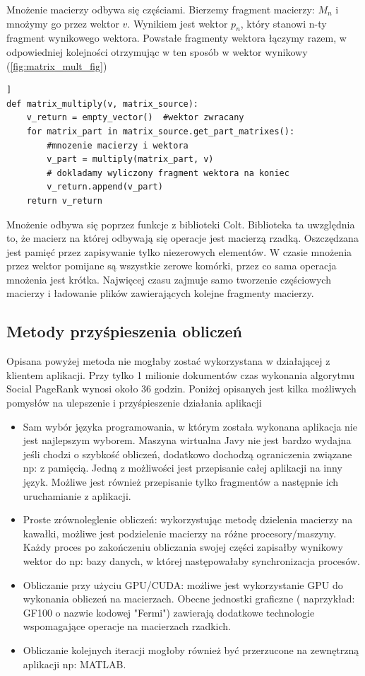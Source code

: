 \documentclass[11pt,a4paper]{report}
\begin{document}
Mnożenie macierzy odbywa się częściami. Bierzemy fragment macierzy: $M_{n}$ i mnożymy go przez wektor $v$. Wynikiem jest wektor $p_n$, który stanowi n-ty fragment wynikowego wektora. Powstałe fragmenty wektora łączymy razem, w odpowiedniej kolejności otrzymując w ten sposób w wektor wynikowy (\ref{fig:matrix_mult_fig})




\lstset{language=Python}
\begin{lstlisting}[frame=lines, caption={Mnożenie macierzy przez wektor v}, label={list:matrix_mult_fig}] ]
def matrix_multiply(v, matrix_source):
	v_return = empty_vector()  #wektor zwracany
	for matrix_part in matrix_source.get_part_matrixes():
		#mnozenie macierzy i wektora
		v_part = multiply(matrix_part, v) 
		# dokladamy wyliczony fragment wektora na koniec
		v_return.append(v_part)   
	return v_return 
\end{lstlisting}

Mnożenie odbywa się poprzez funkcje z biblioteki Colt. Biblioteka ta uwzględnia to, że macierz na której odbywają się operacje jest macierzą rzadką. Oszczędzana jest pamięć przez zapisywanie tylko niezerowych elementów. W czasie mnożenia przez wektor pomijane są wszystkie zerowe komórki, przez co sama operacja mnożenia jest krótka. Najwięcej czasu zajmuje samo tworzenie częściowych  macierzy i ładowanie plików zawierających kolejne fragmenty macierzy. 


\subsection{Metody przyśpieszenia obliczeń}

Opisana powyżej metoda nie mogłaby zostać wykorzystana w działającej z klientem aplikacji. Przy tylko 1 milionie dokumentów czas wykonania algorytmu Social PageRank wynosi około 36 godzin. Poniżej opisanych jest kilka możliwych pomysłów na ulepszenie i przyśpieszenie działania aplikacji

\begin{itemize}
	\item Sam wybór języka programowania, w którym została wykonana aplikacja nie jest najlepszym wyborem. Maszyna wirtualna Javy nie jest bardzo wydajna jeśli chodzi o szybkość obliczeń, dodatkowo dochodzą ograniczenia związane np: z pamięcią. Jedną z możliwości jest przepisanie całej aplikacji na inny język. Możliwe jest również przepisanie tylko fragmentów a następnie ich uruchamianie z aplikacji. 
	\item Proste zrównoleglenie obliczeń: wykorzystując metodę dzielenia macierzy na kawałki, możliwe jest podzielenie macierzy na różne procesory/maszyny. Każdy proces po zakończeniu obliczania swojej części zapisałby wynikowy wektor do np: bazy danych, w której następowałaby synchronizacja procesów. 
	\item Obliczanie przy użyciu GPU/CUDA: możliwe jest wykorzystanie GPU do wykonania obliczeń na macierzach. Obecne jednostki graficzne  ( naprzykład: GF100 o nazwie kodowej "Fermi") zawierają dodatkowe technologie wspomagające operacje na macierzach rzadkich. 
	\item Obliczanie kolejnych iteracji mogłoby również być przerzucone na zewnętrzną aplikacji np: MATLAB.
\end{itemize}
\end{document}

